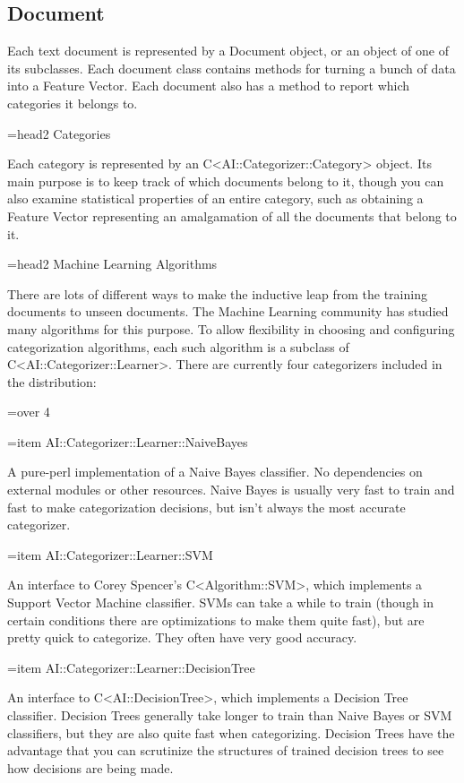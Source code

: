 \documentclass[a4paper]{report}
\begin{document}
\subsection{Document}

Each text document is represented by a Document object, or an object
of one of its subclasses.  Each document class contains methods for
turning a bunch of data into a Feature Vector.  Each document also has
a method to report which categories it belongs to.

=head2 Categories

Each category is represented by an C<AI::Categorizer::Category>
object.  Its main purpose is to keep track of which documents belong
to it, though you can also examine statistical properties of an entire
category, such as obtaining a Feature Vector representing an
amalgamation of all the documents that belong to it.

=head2 Machine Learning Algorithms

There are lots of different ways to make the inductive leap from the
training documents to unseen documents.  The Machine Learning
community has studied many algorithms for this purpose.  To allow
flexibility in choosing and configuring categorization algorithms,
each such algorithm is a subclass of C<AI::Categorizer::Learner>.
There are currently four categorizers included in the distribution:

=over 4

=item AI::Categorizer::Learner::NaiveBayes

A pure-perl implementation of a Naive Bayes classifier.  No
dependencies on external modules or other resources.  Naive Bayes is
usually very fast to train and fast to make categorization decisions,
but isn't always the most accurate categorizer.

=item AI::Categorizer::Learner::SVM

An interface to Corey Spencer's C<Algorithm::SVM>, which implements a
Support Vector Machine classifier.  SVMs can take a while to train
(though in certain conditions there are optimizations to make them
quite fast), but are pretty quick to categorize.  They often have very
good accuracy.

=item AI::Categorizer::Learner::DecisionTree

An interface to C<AI::DecisionTree>, which implements a Decision Tree
classifier.  Decision Trees generally take longer to train than Naive
Bayes or SVM classifiers, but they are also quite fast when
categorizing.  Decision Trees have the advantage that you can
scrutinize the structures of trained decision trees to see how
decisions are being made.
\end{document}
